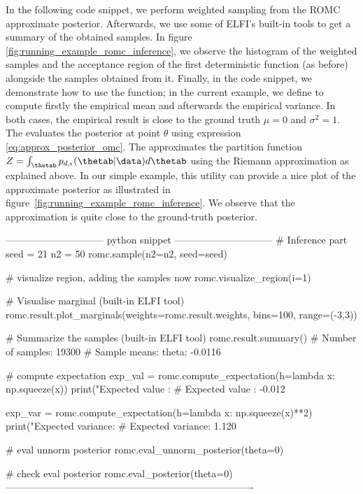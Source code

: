 In the following code snippet, we perform weighted sampling from the
ROMC approximate posterior. Afterwards, we use some of ELFI's
built-in tools to get a summary of the obtained samples. In figure
\ref{fig:running_example_romc_inference}, we observe the histogram of the weighted
samples and the acceptance region of the first deterministic function
(as before) alongside the samples obtained from it. Finally, in the
code snippet, we demonstrate how to use the 
function; in the current example, we define  to compute
firstly the empirical mean and afterwards the empirical variance. In
both cases, the empirical result is close to the ground truth
$\mu = 0$ and $\sigma^2 = 1$. The
 evaluates the posterior at
point $\theta$ using expression \eqref{eq:approx_posterior_omc}. The
 approximates the partition function
$Z = \int_{\thetab} p_{d,\epsilon}(\thetab|\data) d\thetab$ using the
Riemann approximation as explained above. In our simple example, this
utility can provide a nice plot of the approximate posterior as
illustrated in figure~\ref{fig:running_example_romc_inference}. We observe that the
approximation is quite close to the ground-truth posterior.

\begin{Code}
------------------------------ python snippet ------------------------------  
  # Inference part
  seed = 21
  n2 = 50
  romc.sample(n2=n2, seed=seed)

  # visualize region, adding the samples now
  romc.visualize_region(i=1)

  # Visualise marginal (built-in ELFI tool)
  romc.result.plot_marginals(weights=romc.result.weights,
                             bins=100, range=(-3,3))

  # Summarize the samples (built-in ELFI tool)
  romc.result.summary()
  # Number of samples: 19300
  # Sample means: theta: -0.0116

  # compute expectation
  exp_val = romc.compute_expectation(h=lambda x: np.squeeze(x))
  print("Expected value   : %
  # Expected value   : -0.012

  exp_var = romc.compute_expectation(h=lambda x: np.squeeze(x)**2)
  print("Expected variance: %
  # Expected variance: 1.120

  # eval unnorm posterior
  romc.eval_unnorm_posterior(theta=0)

  # check eval posterior
  romc.eval_posterior(theta=0)
----------------------------------------------------------------------------
\end{Code}

